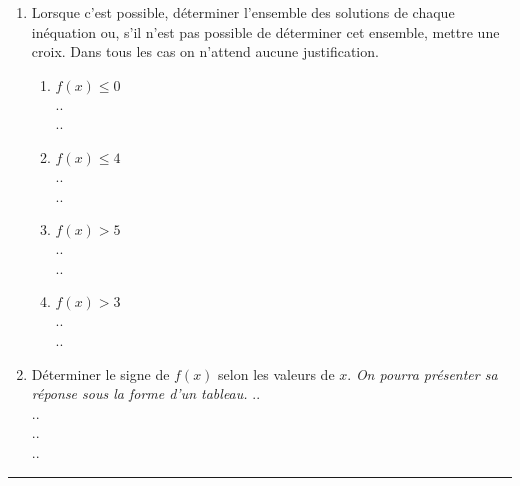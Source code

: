 \begin{exo}[11,5 points]
\begin{enumerate}
\begin{multicols}{2}
\begin{enumerate}
	.\dotfill. 
 \end{enumerate} 
\end{multicols}
 \item Lorsque c'est possible, d\'eterminer l'ensemble des solutions de chaque in\'equation ou, s'il n'est pas possible de d\'eterminer cet ensemble, mettre une croix. Dans tous les cas on n'attend aucune justification.
\begin{multicols}{2}
 \begin{enumerate}
  \item $f(x)\leqslant0$\\
	.\dotfill.\\
	.\dotfill.
   \item $f(x)\leqslant 4$\\
	.\dotfill.\\
	.\dotfill. \sautcol
  \item $f(x)>5$\\
	.\dotfill.\\
	.\dotfill. 
  \item $f(x)> 3$\\
	.\dotfill.\\
	.\dotfill.
 \end{enumerate} 
\end{multicols}
 \item D\'eterminer le signe de $f(x)$ selon les valeurs de $x$. \emph{On pourra pr\'esenter sa r\'eponse sous la forme d'un tableau.}
.\dotfill.\\
.\dotfill.\\
.\dotfill.\\
.\dotfill.
\end{enumerate}
\end{exo}

\medskip

\hrule

\sautpage

